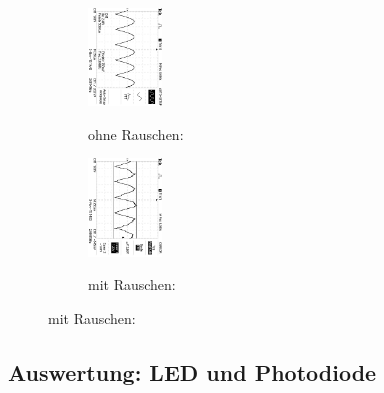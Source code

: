\begin{figure}
\caption{$U_{out} (\phi = 340°$) }
\begin{subfigure}{0.48\textwidth}
\centering
\caption*{ohne Rauschen:}
\includegraphics[angle=90,height=2.6cm]{graphics/ALL0038/F0038TEK.jpg}
\label{fig:phi340o}
\end{subfigure}
\begin{subfigure}{0.48\textwidth}
\centering
\caption*{mit Rauschen:}
\includegraphics[angle=90,height=2.6cm]{graphics/ALL0046/F0046TEK.jpg}
\label{fig:phi340m}
\end{subfigure}
\label{fig:U_out}
\end{figure}
\addtocounter{figure}{-1}

\newpage

\captionsetup{labelformat=default}

\subsection{Auswertung: LED und Photodiode}



